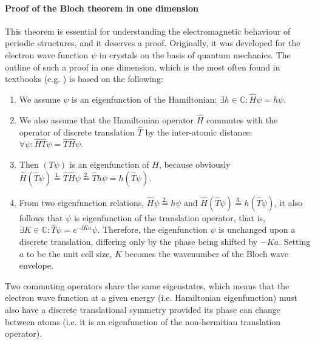 \paragraph{Proof of the Bloch theorem in one dimension}%
This theorem is essential for understanding the electromagnetic behaviour of periodic structures, and it deserves a proof. Originally, it was developed for the electron wave function $\psi$ in crystals on the basis of quantum mechanics. The outline of such a proof in one dimension, which is the most often found in textbooks (e.g. \cite[p. 134]{ashcroft2005solid}) is based on the following:
\label{blochproof}
\begin{enumerate}
 \item{We assume $\psi$ is an eigenfunction of the Hamiltonian: $\exists h\in \mathbb{C}: \hat H\psi = h\psi$.} 
 \item{We also assume that the Hamiltonian operator $\hat H$ commutes with the operator of discrete translation $\hat T$ by the inter-atomic distance: $\forall \psi: \hat H\hat T\psi = \hat T\hat H\psi$. } 
 \item{Then $(T\psi)$ is an eigenfunction of $H$, because obviously $\hat H(\hat T\psi) \stackrel{1.}{=} \hat T\hat H\psi \stackrel{2.}{=} \hat Th\psi = h(\hat T\psi)$.  }
 \item{From two eigenfunction relations, $\hat H\psi\stackrel{2.}{=} h\psi$ and $\hat H(\hat T\psi) \stackrel{3.}{=} h(\hat T\psi)$, it also follows that $\psi$ is eigenfunction of the translation operator, that is,
$\exists K\in \mathbb{C}: \hat T\psi = e^{-\ii Ka}\psi$.  Therefore, the eigenfunction $\psi$ is unchanged upon a discrete translation, differing only by the phase being shifted by $-Ka$. Setting $a$ to be the unit cell size, $K$ becomes the wavenumber of the Bloch wave envelope.
}
 \end{enumerate}
Two commuting operators share the same eigenstates, which means that the electron wave function at a given energy (i.e. Hamiltonian eigenfunction) must also have a discrete translational symmetry provided its phase can change between atoms (i.e. it is an eigenfunction of the non-hermitian translation operator).

